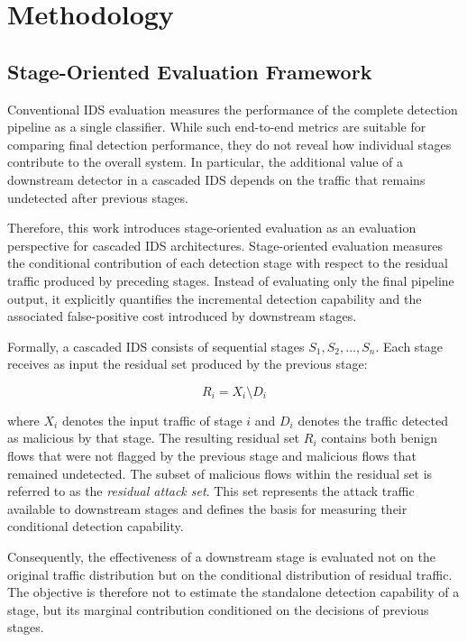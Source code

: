 \documentclass[conference]{IEEEtran}
\begin{document}

\section{Methodology}
\label{sec:methodology}

\subsection{Stage-Oriented Evaluation Framework}
\label{subsec:framework}

Conventional IDS evaluation measures the performance of the complete detection
pipeline as a single classifier. While such end-to-end metrics are suitable for
comparing final detection performance, they do not reveal how individual stages
contribute to the overall system. In particular, the additional value of a
downstream detector in a cascaded IDS depends on the traffic that remains
undetected after previous stages.

Therefore, this work introduces stage-oriented evaluation as an evaluation
perspective for cascaded IDS architectures. Stage-oriented evaluation measures
the conditional contribution of each detection stage with respect to the
residual traffic produced by preceding stages. Instead of evaluating only the
final pipeline output, it explicitly quantifies the incremental detection
capability and the associated false-positive cost introduced by downstream
stages.

Formally, a cascaded IDS consists of sequential stages
$S_1, S_2, ..., S_n$. Each stage receives as input the residual set produced by
the previous stage:

\begin{equation}
R_i = X_i \setminus D_i
\end{equation}

where $X_i$ denotes the input traffic of stage $i$ and $D_i$ denotes the traffic
detected as malicious by that stage. The resulting residual set $R_i$
contains both benign flows that were not flagged by the previous stage and
malicious flows that remained undetected. The subset of
malicious flows within the residual set is referred to as the \emph{residual attack set}. This set represents the attack traffic available to downstream stages and defines the basis for measuring their conditional detection capability.

Consequently, the effectiveness of a
downstream stage is evaluated not on the original traffic distribution but on
the conditional distribution of residual traffic. The objective is therefore not to estimate the standalone detection capability of a stage, but its marginal contribution conditioned on the decisions of
previous stages.
\end{document}
